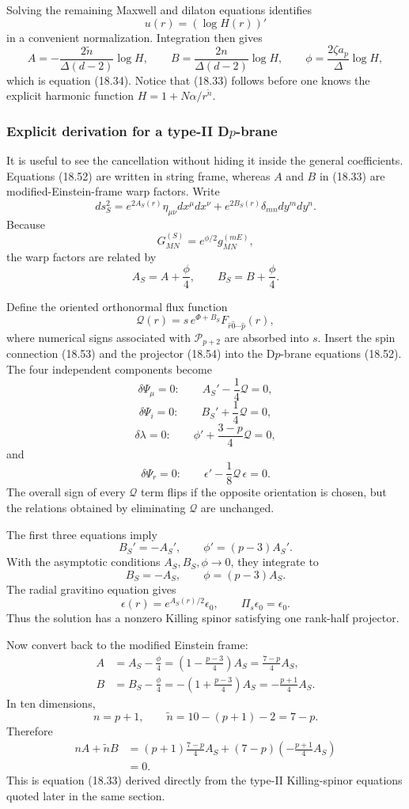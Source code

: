 \documentclass[
  10pt,
  a4paper,
  openany]{book}
\begin{document}
Solving the remaining Maxwell and dilaton equations identifies \[
u(r)=(\log H(r))'
\] in a convenient normalization. Integration then gives \[
A=-\frac{2\tilde n}{\Delta(d-2)}\log H,
\qquad
B=\frac{2n}{\Delta(d-2)}\log H,
\qquad
\phi=\frac{2\zeta a_p}{\Delta}\log H,
\] which is equation (18.34). Notice that (18.33) follows before one
knows the explicit harmonic function \(H=1+N\alpha/r^{\tilde n}\).

\subsubsection{\texorpdfstring{Explicit derivation for a type-II
D\(p\)-brane}{Explicit derivation for a type-II Dp-brane}}\label{explicit-derivation-for-a-type-ii-dp-brane}

It is useful to see the cancellation without hiding it inside the
general coefficients. Equations (18.52) are written in string frame,
whereas \(A\) and \(B\) in (18.33) are modified-Einstein-frame warp
factors. Write \[
ds_S^2
=e^{2A_S(r)}\eta_{\mu\nu}dx^\mu dx^\nu
+e^{2B_S(r)}\delta_{mn}dy^m dy^n.
\] Because \[
G^{(S)}_{MN}=e^{\phi/2}g^{(mE)}_{MN},
\] the warp factors are related by \[
\boxed{
A_S=A+\frac{\phi}{4},
\qquad
B_S=B+\frac{\phi}{4}
}.
\]

Define the oriented orthonormal flux function \[
\mathcal Q(r)
=s\,e^{\Phi+B_S}
F_{\hat r\hat0\cdots\hat p}(r),
\] where numerical signs associated with \(\mathcal P_{p+2}\) are
absorbed into \(s\). Insert the spin connection (18.53) and the
projector (18.54) into the D\(p\)-brane equations (18.52). The four
independent components become \[
\delta\Psi_\mu=0:
\qquad
A_S'-\frac14\mathcal Q=0,
\] \[
\delta\Psi_i=0:
\qquad
B_S'+\frac14\mathcal Q=0,
\] \[
\delta\lambda=0:
\qquad
\phi'+\frac{3-p}{4}\mathcal Q=0,
\] and \[
\delta\Psi_r=0:
\qquad
\epsilon'-\frac18\mathcal Q\,\epsilon=0.
\] The overall sign of every \(\mathcal Q\) term flips if the opposite
orientation is chosen, but the relations obtained by eliminating
\(\mathcal Q\) are unchanged.

The first three equations imply \[
\boxed{
B_S'=-A_S',
\qquad
\phi'=(p-3)A_S'
}.
\] With the asymptotic conditions \(A_S,B_S,\phi\to0\), they integrate
to \[
B_S=-A_S,
\qquad
\phi=(p-3)A_S.
\] The radial gravitino equation gives \[
\epsilon(r)=e^{A_S(r)/2}\epsilon_0,
\qquad
\Pi_s\epsilon_0=\epsilon_0.
\] Thus the solution has a nonzero Killing spinor satisfying one
rank-half projector.

Now convert back to the modified Einstein frame: \[
\begin{aligned}
A
&=A_S-\frac{\phi}{4}
=\left(1-\frac{p-3}{4}\right)A_S
=\frac{7-p}{4}A_S,\\
B
&=B_S-\frac{\phi}{4}
=-\left(1+\frac{p-3}{4}\right)A_S
=-\frac{p+1}{4}A_S.
\end{aligned}
\] In ten dimensions, \[
n=p+1,
\qquad
\tilde n=10-(p+1)-2=7-p.
\] Therefore \[
\begin{aligned}
nA+\tilde nB
&=(p+1)\frac{7-p}{4}A_S
+(7-p)\left(-\frac{p+1}{4}A_S\right)\\
&=0.
\end{aligned}
\] This is equation (18.33) derived directly from the type-II
Killing-spinor equations quoted later in the same section.
\end{document}
